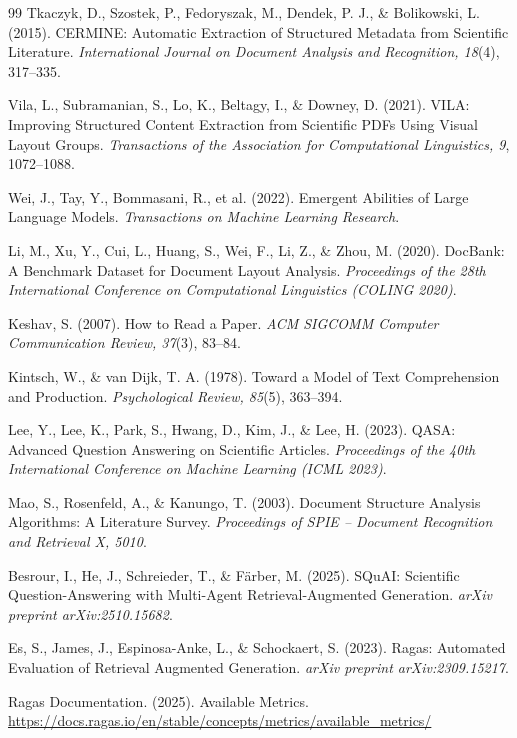 \documentclass[12pt,a4paper]{report}
\begin{document}
\begin{thebibliography}{99}
Tkaczyk, D., Szostek, P., Fedoryszak, M., Dendek, P. J., \& Bolikowski, L.
(2015). CERMINE: Automatic Extraction of Structured Metadata from Scientific
Literature. \textit{International Journal on Document Analysis and Recognition,
18}(4), 317--335.

Vila, L., Subramanian, S., Lo, K., Beltagy, I., \& Downey, D. (2021). VILA:
Improving Structured Content Extraction from Scientific PDFs Using Visual
Layout Groups. \textit{Transactions of the Association for Computational
Linguistics, 9}, 1072--1088.

Wei, J., Tay, Y., Bommasani, R., et al. (2022). Emergent Abilities of Large
Language Models. \textit{Transactions on Machine Learning Research}.

Li, M., Xu, Y., Cui, L., Huang, S., Wei, F., Li, Z., \& Zhou, M. (2020).
DocBank: A Benchmark Dataset for Document Layout Analysis. \textit{Proceedings
of the 28th International Conference on Computational Linguistics (COLING
2020)}.

Keshav, S. (2007). How to Read a Paper. \textit{ACM SIGCOMM Computer
Communication Review, 37}(3), 83--84.

Kintsch, W., \& van Dijk, T. A. (1978). Toward a Model of Text Comprehension
and Production. \textit{Psychological Review, 85}(5), 363--394.

Lee, Y., Lee, K., Park, S., Hwang, D., Kim, J., \& Lee, H. (2023). QASA:
Advanced Question Answering on Scientific Articles. \textit{Proceedings of the
40th International Conference on Machine Learning (ICML 2023)}.

Mao, S., Rosenfeld, A., \& Kanungo, T. (2003). Document Structure Analysis
Algorithms: A Literature Survey. \textit{Proceedings of SPIE -- Document
Recognition and Retrieval X, 5010}.

Besrour, I., He, J., Schreieder, T., \& Färber, M. (2025). SQuAI: Scientific
Question-Answering with Multi-Agent Retrieval-Augmented Generation.
\textit{arXiv preprint arXiv:2510.15682}.

Es, S., James, J., Espinosa-Anke, L., \& Schockaert, S. (2023). Ragas:
Automated Evaluation of Retrieval Augmented Generation. \textit{arXiv preprint
arXiv:2309.15217}.

Ragas Documentation. (2025). Available Metrics.
\url{https://docs.ragas.io/en/stable/concepts/metrics/available_metrics/}


\end{thebibliography}
\end{document}
